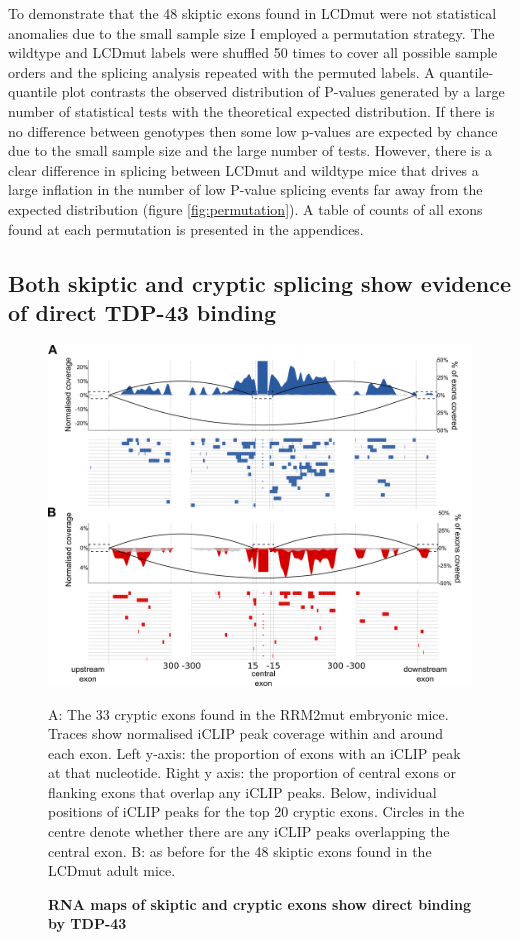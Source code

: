 To demonstrate that the 48 skiptic exons found in LCDmut were not statistical anomalies due to the small sample size I employed a permutation strategy.
 The wildtype and LCDmut labels were shuffled 50 times to cover all possible sample orders and the splicing analysis repeated with the permuted labels. 
A quantile-quantile plot contrasts the observed distribution of P-values generated by a large number of statistical tests with the theoretical expected distribution. 
If there is no difference between genotypes then some low p-values are expected by chance due to the small sample size and the large number of tests. 
However, there is a clear difference in splicing between LCDmut and wildtype mice that drives a large inflation in the number of low P-value splicing events far away from the expected distribution (figure \ref{fig:permutation}).
A table of counts of all exons found at each permutation is presented in the appendices.   


\subsection{Both skiptic and cryptic splicing show evidence of direct TDP-43 binding}

\begin{figure}[h!]
	\centering
	\includegraphics[width=\textwidth]{Figures/05_tdp_mice/iclip_multipanel.png}
	\caption{\textbf{RNA maps of skiptic and cryptic exons show direct binding by TDP-43}}
	A: The 33 cryptic exons found in the RRM2mut embryonic mice. Traces show normalised iCLIP peak coverage within and around each exon. Left y-axis: the proportion of exons with an iCLIP peak at that nucleotide. Right y axis: the proportion of central exons or flanking exons that overlap any iCLIP peaks. Below, individual positions of iCLIP peaks for the top 20 cryptic exons. Circles in the centre denote whether there are any iCLIP peaks overlapping the central exon. B: as before for the 48 skiptic exons found in the LCDmut adult mice.
	\label{iclip_multi}
\end{figure}

